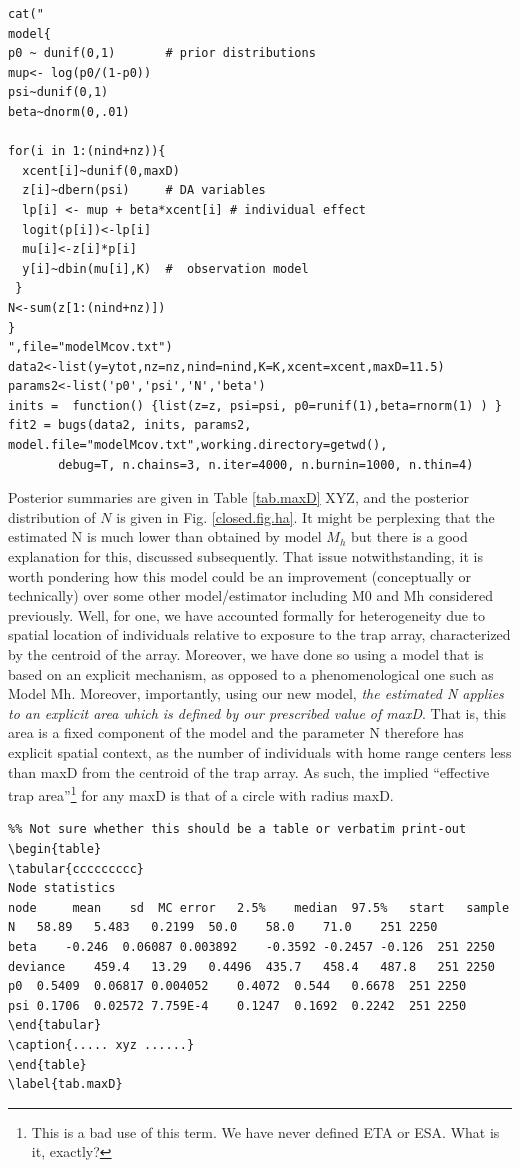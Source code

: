 {\small
\begin{verbatim}
cat("
model{
p0 ~ dunif(0,1)       # prior distributions
mup<- log(p0/(1-p0))
psi~dunif(0,1)
beta~dnorm(0,.01)

for(i in 1:(nind+nz)){
  xcent[i]~dunif(0,maxD)
  z[i]~dbern(psi)     # DA variables
  lp[i] <- mup + beta*xcent[i] # individual effect
  logit(p[i])<-lp[i]
  mu[i]<-z[i]*p[i]
  y[i]~dbin(mu[i],K)  #  observation model
 }
N<-sum(z[1:(nind+nz)])
}
",file="modelMcov.txt")
data2<-list(y=ytot,nz=nz,nind=nind,K=K,xcent=xcent,maxD=11.5)
params2<-list('p0','psi','N','beta')
inits =  function() {list(z=z, psi=psi, p0=runif(1),beta=rnorm(1) ) }
fit2 = bugs(data2, inits, params2, model.file="modelMcov.txt",working.directory=getwd(),
       debug=T, n.chains=3, n.iter=4000, n.burnin=1000, n.thin=4)
\end{verbatim}
}

Posterior summaries are given in Table \ref{tab.maxD} XYZ, and the
posterior distribution of $N$ is given in Fig. \ref{closed.fig.ha}. It might be
perplexing that the estimated N is much lower than obtained by model
$M_h$ but there is a good explanation for this, discussed
subsequently. That issue notwithstanding, it is worth pondering how
this model could be an improvement (conceptually or technically) over
some other model/estimator including M0 and Mh considered
previously. Well, for one, we have accounted formally for
heterogeneity due to spatial location of individuals relative to
exposure to the trap array, characterized by the centroid of the
array. Moreover, we have done so using a model that is based on an
explicit mechanism, as opposed to a phenomenological one such as Model
Mh. Moreover, importantly, using our new model, {\it the estimated N
  applies to an explicit area which is defined by our prescribed value
  of maxD}. That is, this area is a fixed component of the model and
the parameter N therefore has explicit spatial context, as the number
of individuals with home range centers less than maxD from the
centroid of the trap array. As such, the implied ``effective trap
area''\footnote{This is a bad use of this term. We have never defined
  ETA or ESA. What is it, exactly?} for any maxD is that of a circle
with radius maxD.

\begin{verbatim}
%% Not sure whether this should be a table or verbatim print-out
\begin{table}
\tabular{ccccccccc}
Node statistics
node	 mean	 sd	 MC error	2.5%	median	97.5%	start	sample
N	58.89	5.483	0.2199	50.0	58.0	71.0	251	2250
beta	-0.246	0.06087	0.003892	-0.3592	-0.2457	-0.126	251	2250
deviance	459.4	13.29	0.4496	435.7	458.4	487.8	251	2250
p0	0.5409	0.06817	0.004052	0.4072	0.544	0.6678	251	2250
psi	0.1706	0.02572	7.759E-4	0.1247	0.1692	0.2242	251	2250
\end{tabular}
\caption{..... xyz ......}
\end{table}
\label{tab.maxD}
\end{verbatim}

